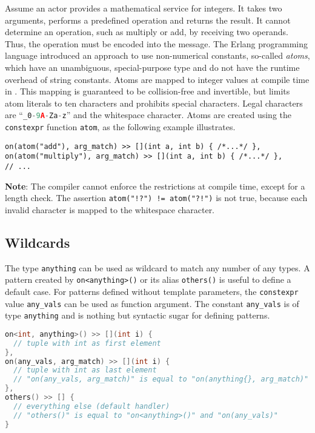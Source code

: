Assume an actor provides a mathematical service for integers.
It takes two arguments, performs a predefined operation and returns the result.
It cannot determine an operation, such as multiply or add, by receiving two operands.
Thus, the operation must be encoded into the message.
The Erlang programming language introduced an approach to use non-numerical
constants, so-called \textit{atoms}, which have an unambiguous, special-purpose type and do not have the runtime overhead of string constants.
Atoms are mapped to integer values at compile time in \libcppa.
This mapping is guaranteed to be collision-free and invertible, but limits atom literals to ten characters and prohibits special characters.
Legal characters are ``\lstinline[language=C++]^_0-9A-Za-z^'' and the whitespace character.
Atoms are created using the \lstinline^constexpr^ function \lstinline^atom^, as the following example illustrates.

\begin{lstlisting}
on(atom("add"), arg_match) >> [](int a, int b) { /*...*/ },
on(atom("multiply"), arg_match) >> [](int a, int b) { /*...*/ },
// ...
\end{lstlisting}

\textbf{Note}: The compiler cannot enforce the restrictions at compile time, except for a length check.
The assertion \lstinline^atom("!?") != atom("?!")^ is not true, because each invalid character is mapped to the whitespace character.

\clearpage
\subsection{Wildcards}
\label{Sec::PatternMatching::Wildcards}

The type \lstinline^anything^ can be used as wildcard to match any number of any types.
A pattern created by \lstinline^on<anything>()^ or its alias \lstinline^others()^ is useful to define a default case.
For patterns defined without template parameters, the \lstinline^constexpr^ value \lstinline^any_vals^ can be used as function argument.
The constant \lstinline^any_vals^ is of type \lstinline^anything^ and is nothing but syntactic sugar for defining patterns.

\begin{lstlisting}[language=C++]
on<int, anything>() >> [](int i) {
  // tuple with int as first element
},
on(any_vals, arg_match) >> [](int i) {
  // tuple with int as last element
  // "on(any_vals, arg_match)" is equal to "on(anything{}, arg_match)"
},
others() >> [] {
  // everything else (default handler)
  // "others()" is equal to "on<anything>()" and "on(any_vals)"
}
\end{lstlisting}

